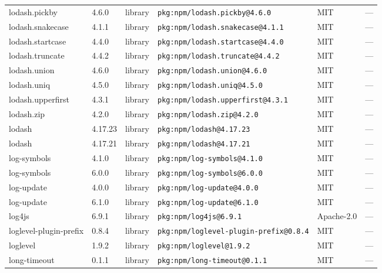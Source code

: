\documentclass[11pt,a4paper]{article}
\begin{document}
\begin{longtable}{|p{4cm}|p{2cm}|p{1.6cm}|p{5cm}|p{1.5cm}|p{3.5cm}|}
\raggedright lodash.pickby & 4.6.0 & library & \small\texttt{pkg:npm/lodash.pickby@4.6.0} & MIT & \small — \\
\raggedright lodash.snakecase & 4.1.1 & library & \small\texttt{pkg:npm/lodash.snakecase@4.1.1} & MIT & \small — \\
\raggedright lodash.startcase & 4.4.0 & library & \small\texttt{pkg:npm/lodash.startcase@4.4.0} & MIT & \small — \\
\raggedright lodash.truncate & 4.4.2 & library & \small\texttt{pkg:npm/lodash.truncate@4.4.2} & MIT & \small — \\
\raggedright lodash.union & 4.6.0 & library & \small\texttt{pkg:npm/lodash.union@4.6.0} & MIT & \small — \\
\raggedright lodash.uniq & 4.5.0 & library & \small\texttt{pkg:npm/lodash.uniq@4.5.0} & MIT & \small — \\
\raggedright lodash.upperfirst & 4.3.1 & library & \small\texttt{pkg:npm/lodash.upperfirst@4.3.1} & MIT & \small — \\
\raggedright lodash.zip & 4.2.0 & library & \small\texttt{pkg:npm/lodash.zip@4.2.0} & MIT & \small — \\
\raggedright lodash & 4.17.23 & library & \small\texttt{pkg:npm/lodash@4.17.23} & MIT & \small — \\
\raggedright lodash & 4.17.21 & library & \small\texttt{pkg:npm/lodash@4.17.21} & MIT & \small — \\
\raggedright log-symbols & 4.1.0 & library & \small\texttt{pkg:npm/log-symbols@4.1.0} & MIT & \small — \\
\raggedright log-symbols & 6.0.0 & library & \small\texttt{pkg:npm/log-symbols@6.0.0} & MIT & \small — \\
\raggedright log-update & 4.0.0 & library & \small\texttt{pkg:npm/log-update@4.0.0} & MIT & \small — \\
\raggedright log-update & 6.1.0 & library & \small\texttt{pkg:npm/log-update@6.1.0} & MIT & \small — \\
\raggedright log4js & 6.9.1 & library & \small\texttt{pkg:npm/log4js@6.9.1} & Apache-2.0 & \small — \\
\raggedright loglevel-plugin-prefix & 0.8.4 & library & \small\texttt{pkg:npm/loglevel-plugin-prefix@0.8.4} & MIT & \small — \\
\raggedright loglevel & 1.9.2 & library & \small\texttt{pkg:npm/loglevel@1.9.2} & MIT & \small — \\
\raggedright long-timeout & 0.1.1 & library & \small\texttt{pkg:npm/long-timeout@0.1.1} & MIT & \small — \\

\end{longtable}
\end{document}
